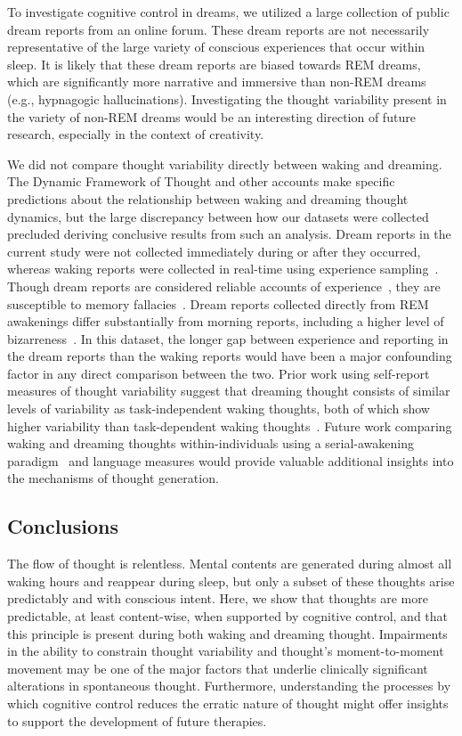 \documentclass[10pt,a4paper,twocolumn]{article}
\begin{document}
\par
To investigate cognitive control in dreams, we utilized a large collection of public dream reports from an online forum. These dream reports are not necessarily representative of the large variety of conscious experiences that occur within sleep. It is likely that these dream reports are biased towards REM dreams, which are significantly more narrative and immersive than non-REM dreams (e.g., hypnagogic hallucinations). Investigating the thought variability present in the variety of non-REM dreams would be an interesting direction of future research, especially in the context of creativity.

\par
We did not compare thought variability directly between waking and dreaming. The Dynamic Framework of Thought and other accounts make specific predictions about the relationship between waking and dreaming thought dynamics, but the large discrepancy between how our datasets were collected precluded deriving conclusive results from such an analysis. Dream reports in the current study were not collected immediately during or after they occurred, whereas waking reports were collected in real-time using experience sampling~\cite{trull2009}. Though dream reports are considered reliable accounts of experience~\cite{windt2013}, they are susceptible to memory fallacies~\cite{rosen2013}. Dream reports collected directly from REM awakenings differ substantially from morning reports, including a higher level of bizarreness~\cite{kirberg2022}. In this dataset, the longer gap between experience and reporting in the dream reports than the waking reports would have been a major confounding factor in any direct comparison between the two. Prior work using self-report measures of thought variability suggest that dreaming thought consists of similar levels of variability as task-independent waking thoughts, both of which show higher variability than task-dependent waking thoughts~\cite{gross2021}. Future work comparing waking and dreaming thoughts within-individuals using a serial-awakening paradigm~\cite{siclari2013} and language measures would provide valuable additional insights into the mechanisms of thought generation.


\subsection*{Conclusions}

The flow of thought is relentless. Mental contents are generated during almost all waking hours and reappear during sleep, but only a subset of these thoughts arise predictably and with conscious intent. Here, we show that thoughts are more predictable, at least content-wise, when supported by cognitive control, and that this principle is present during both waking and dreaming thought. Impairments in the ability to constrain thought variability and thought's moment-to-moment movement may be one of the major factors that underlie clinically significant alterations in spontaneous thought. Furthermore, understanding the processes by which cognitive control reduces the erratic nature of thought might offer insights to support the development of future therapies.
\end{document}
